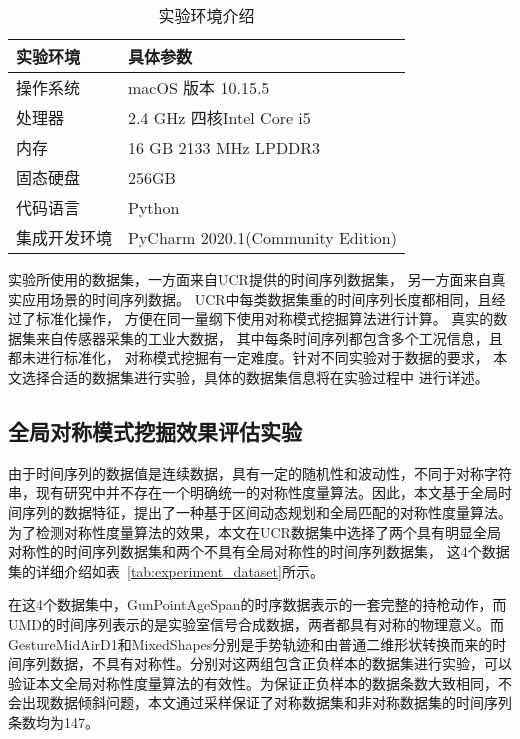 \begin{table}
  \centering
  \caption{实验环境介绍}
  \begin{tabular}{ll}
    \toprule
    实验环境     & 具体参数                          \\
    \midrule
    操作系统     & macOS 版本 10.15.5                \\
    处理器       & 2.4 GHz 四核Intel Core i5         \\
    内存         & 16 GB 2133 MHz LPDDR3             \\
    固态硬盘     & 256GB                             \\
    代码语言     & Python                            \\
    集成开发环境 & PyCharm 2020.1(Community Edition) \\
    \bottomrule
  \end{tabular}
  \label{tab:experiment_enviroment}
\end{table}

实验所使用的数据集，一方面来自UCR提供的时间序列数据集，
另一方面来自真实应用场景的时间序列数据。
UCR中每类数据集重的时间序列长度都相同，且经过了标准化操作，
方便在同一量纲下使用对称模式挖掘算法进行计算。
真实的数据集来自传感器采集的工业大数据，
其中每条时间序列都包含多个工况信息，且都未进行标准化，
对称模式挖掘有一定难度。针对不同实验对于数据的要求，
本文选择合适的数据集进行实验，具体的数据集信息将在实验过程中
进行详述。

\subsection{全局对称模式挖掘效果评估实验}
由于时间序列的数据值是连续数据，具有一定的随机性和波动性，不同于对称字符串，现有研究中并不存在一个明确统一的对称性度量算法。因此，本文基于全局时间序列的数据特征，提出了一种基于区间动态规划和全局匹配的对称性度量算法。为了检测对称性度量算法的效果，本文在UCR数据集中选择了两个具有明显全局对称性的时间序列数据集和两个不具有全局对称性的时间序列数据集，
这4个数据集的详细介绍如表~\ref{tab:experiment_dataset}所示。

在这4个数据集中，GunPointAgeSpan的时序数据表示的一套完整的持枪动作，而UMD的时间序列表示的是实验室信号合成数据，两者都具有对称的物理意义。而GestureMidAirD1和MixedShapes分别是手势轨迹和由普通二维形状转换而来的时间序列数据，不具有对称性。分别对这两组包含正负样本的数据集进行实验，可以验证本文全局对称性度量算法的有效性。为保证正负样本的数据条数大致相同，不会出现数据倾斜问题，本文通过采样保证了对称数据集和非对称数据集的时间序列条数均为147。

